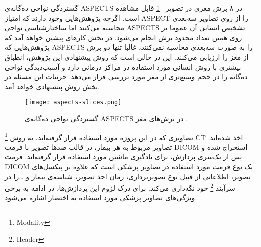 گستردگی نواحی ده‌گانه‌ی ASPECTS در ۸ برش مغزی در تصویر ~\ref{fig:aspects-slices} قابل مشاهده است.
اگرچه پژوهش‌هایی وجود دارند که امتیاز ASPECT را از روی تصاویر سه‌بعدی محاسبه می‌کنند اما 
ساختارشناسی نواحی ASPECTS تشخیص انسانی آن عموما بر روی همین تعداد محدود برش انجام می‌شود.
در بخش کارهای پیشین خواهد آمد که پژوهش‌هایی که ASPECTS را به صورت سه‌بعدی محاسبه نمی‌کنند، غالبا تنها دو برش از مغز را ارزیابی می‌کنند.
این در حالی است که روش پیشنهادی این پژوهش، انطباق بیشتری با روش انسانی مورد استفاده در مراکز درمانی دارد و 
آسیب‌دیدگی نواحی ده‌گانه را در حجم وسیع‌تری از مغز مورد بررسی قرار می‌دهد. جزئیات این مسئله در بخش روش پیشنهادی خواهد آمد.

\begin{figure}[ht]
\centering
\texttt{[image: aspects-slices.png]}
\caption[]{گستردگی نواحی ده‌گانه‌ی ASPECTS در برش‌های مغز \cite{wilson2018minds}.}
\label{fig:aspects-slices}
\end{figure}


تصاویری که در این پروژه مورد استفاده قرار گرفته‌اند، به روش
\footnote{Modality}
 CT اخذ شده‌اند.
تصاویر مربوط به هر بیمار، در قالب صدها تصویر با فرمت DICOM استخراج شده و پس از یک‌سری پردازش، برای یادگیری ماشین مورد استفاده قرار گرفته‌اند.
فرمت DICOM یک نوع فرمت مورد استفاده در تصاویر پزشکی است که علاوه بر پیکسل‌های تصویر، اطلاعاتی از قبیل نوع تصویربرداری، زمان احذ تصویر، شناسه‌ی بیمار و \dots را در سرآیند
\footnote{Header}
خود نگه‌داری می‌کند.
برای درک لزوم این پردازش‌ها، در ادامه به برخی ویژگی‌های تصاویر پزشکی مورد استفاده به اختصار اشاره می‌شود.

